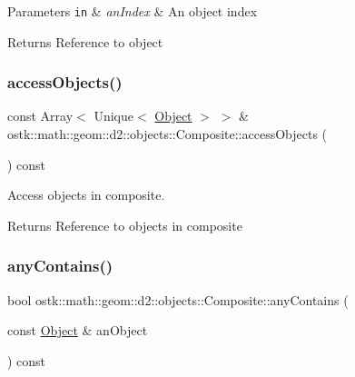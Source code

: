 \begin{DoxyParams}[1]{Parameters}
\mbox{\tt in}  & {\em an\+Index} & An object index \\
\hline
\end{DoxyParams}
\begin{DoxyReturn}{Returns}
Reference to object 
\end{DoxyReturn}
\mbox{\label{classostk_1_1math_1_1geom_1_1d2_1_1objects_1_1_composite_aec409e3a61aafa5b0722b5985a6885d8}} 
\subsubsection{\texorpdfstring{access\+Objects()}{accessObjects()}}
{\footnotesize\ttfamily const Array$<$ Unique$<$ \hyperlink{classostk_1_1math_1_1geom_1_1d2_1_1_object}{Object} $>$ $>$ \& ostk\+::math\+::geom\+::d2\+::objects\+::\+Composite\+::access\+Objects (\begin{DoxyParamCaption}{ }\end{DoxyParamCaption}) const}



Access objects in composite. 

\begin{DoxyReturn}{Returns}
Reference to objects in composite 
\end{DoxyReturn}
\mbox{\label{classostk_1_1math_1_1geom_1_1d2_1_1objects_1_1_composite_a7d12435c1aa85c4e396a2943b1f38cfb}} 
\subsubsection{\texorpdfstring{any\+Contains()}{anyContains()}\hspace{0.1cm}{\footnotesize\ttfamily [1/2]}}
{\footnotesize\ttfamily bool ostk\+::math\+::geom\+::d2\+::objects\+::\+Composite\+::any\+Contains (\begin{DoxyParamCaption}\item[{const \hyperlink{classostk_1_1math_1_1geom_1_1d2_1_1_object}{Object} \&}]{an\+Object }\end{DoxyParamCaption}) const}



